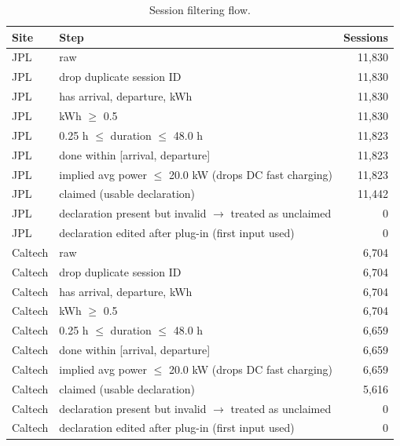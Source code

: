 \begin{table}[H]
\centering
\caption{Session filtering flow.}
\label{tab:flow}
\footnotesize
\setlength{\tabcolsep}{1.5pt}
\begin{tabular*}{\textwidth}{@{\extracolsep{\fill}}lp{}r@{}}
\hline
Site & Step & Sessions \\
\hline
JPL & raw & 11,830 \\
JPL & drop duplicate session ID & 11,830 \\
JPL & has arrival, departure, kWh & 11,830 \\
JPL & kWh $\geq$ 0.5 & 11,830 \\
JPL & 0.25 h $\leq$ duration $\leq$ 48.0 h & 11,823 \\
JPL & done within [arrival, departure] & 11,823 \\
JPL & implied avg power $\leq$ 20.0 kW (drops DC fast charging) & 11,823 \\
JPL & claimed (usable declaration) & 11,442 \\
JPL & declaration present but invalid $\rightarrow$ treated as unclaimed & 0 \\
JPL & declaration edited after plug-in (first input used) & 0 \\
\hline
Caltech & raw & 6,704 \\
Caltech & drop duplicate session ID & 6,704 \\
Caltech & has arrival, departure, kWh & 6,704 \\
Caltech & kWh $\geq$ 0.5 & 6,704 \\
Caltech & 0.25 h $\leq$ duration $\leq$ 48.0 h & 6,659 \\
Caltech & done within [arrival, departure] & 6,659 \\
Caltech & implied avg power $\leq$ 20.0 kW (drops DC fast charging) & 6,659 \\
Caltech & claimed (usable declaration) & 5,616 \\
Caltech & declaration present but invalid $\rightarrow$ treated as unclaimed & 0 \\
Caltech & declaration edited after plug-in (first input used) & 0 \\
\hline
\end{tabular*}
\end{table}
